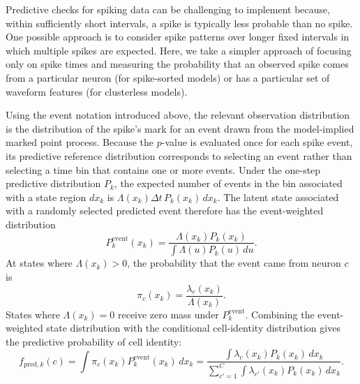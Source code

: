 \documentclass[12pt]{article}
\begin{document}
Predictive checks for spiking data can be challenging to implement because, within sufficiently short intervals, a spike is typically less probable than no spike. One possible approach is to consider spike patterns over longer fixed intervals in which multiple spikes are expected. Here, we take a simpler approach of focusing only on spike times and measuring the probability that an observed spike comes from a particular neuron (for spike-sorted models) or has a particular set of waveform features (for clusterless models).

Using the event notation introduced above, the relevant observation distribution is the distribution of the spike's mark for an event drawn from the model-implied marked point process. Because the $p$-value is evaluated once for each spike event, its predictive reference distribution corresponds to selecting an event rather than selecting a time bin that contains one or more events. Under the one-step predictive distribution $P_k$, the expected number of events in the bin associated with a state region $dx_k$ is $\Lambda(x_k)\Delta t\,P_k(x_k)\,dx_k$. The latent state associated with a randomly selected predicted event therefore has the event-weighted distribution
\begin{equation}
    \label{eq:event_weighted_predictive}
    P_k^{\mathrm{event}}(x_k)
    = \frac{\Lambda(x_k)P_k(x_k)}{\int \Lambda(u)P_k(u)\,du}.
\end{equation}
At states where $\Lambda(x_k)>0$, the probability that the event came from neuron $c$ is
\begin{equation}
    \label{eq:conditional_cell_identity}
    \pi_c(x_k)
    = \frac{\lambda_c(x_k)}{\Lambda(x_k)}.
\end{equation}
States where $\Lambda(x_k)=0$ receive zero mass under $P_k^{\mathrm{event}}$.
Combining the event-weighted state distribution with the conditional cell-identity distribution gives the predictive probability of cell identity:
\begin{equation}
    \label{eq:fpred_sorted}
    f_{\mathrm{pred},k}(c)
    = \int \pi_c(x_k)P_k^{\mathrm{event}}(x_k)\,dx_k
    = \frac{\int \lambda_c(x_k)P_k(x_k)\,dx_k}
    {\sum_{c'=1}^{C}\int \lambda_{c'}(x_k)P_k(x_k)\,dx_k}.
\end{equation}
\end{document}
